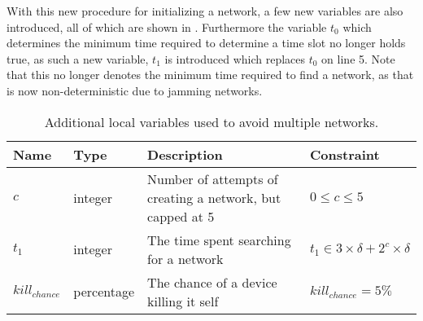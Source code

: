 \bigskip \noindent
With this new procedure for initializing a network, a few new variables are also introduced, all of which are shown in .
Furthermore the variable $t_0$ which determines the minimum time required to determine a time slot no longer holds true, as such a new variable, $t_1$ is introduced which replaces $t_0$ on  line 5.
Note that this no longer denotes the minimum time required to find a network, as that is now non-deterministic due to jamming networks.
\begin{table}[h]
    {\setlength{\extrarowheight}{1ex}%
    \begin{tabularx}{\textwidth}{l|l|X|l}
        \toprule
        Name                & Type       & Description & Constraint \\
        \midrule
        $c$                 & integer    & Number of attempts of creating a network, but capped at 5                         & $0 \leq c \leq 5$     \\
        $t_1$               & integer    & The time spent searching for a network                                            & $t_1 \in 3 \times \delta + 2^c \times \delta$     \\
        $kill_{chance}$     & percentage & The chance of a device killing it self                                            & $kill_{chance} = 5\%$  \\
        \bottomrule
    \end{tabularx}}
    \caption{Additional local variables used to avoid multiple networks.}
    \label{tab:locals_wmultistartup}
\end{table}